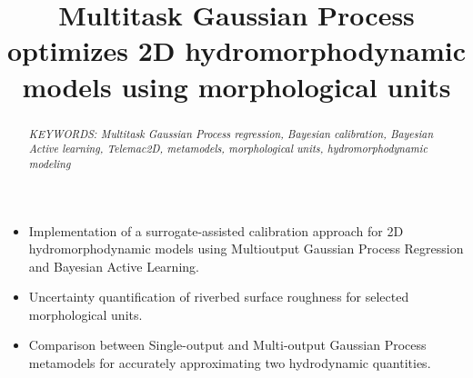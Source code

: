 \documentclass[draft,linenumbers,onecolumn]{agujournal2019} %
\begin{document}
\title{Multitask Gaussian Process optimizes 2D hydromorphodynamic models using  morphological units}

\graphicspath{ {./images/} }

%
%






\begin{itemize}
	\item Implementation of a surrogate-assisted calibration approach for 2D hydromorphodynamic models using Multioutput Gaussian Process Regression and Bayesian Active Learning.
	\item Uncertainty quantification of riverbed surface roughness for selected morphological units.
	\item Comparison between Single-output and Multi-output Gaussian Process metamodels for accurately approximating two hydrodynamic quantities.
\end{itemize}

%
%



\begin{abstract}
	
	
\textit{KEYWORDS: Multitask Gaussian Process regression, Bayesian calibration, Bayesian Active learning, Telemac2D, metamodels, morphological units, hydromorphodynamic modeling}
\end{abstract}
\end{document}
